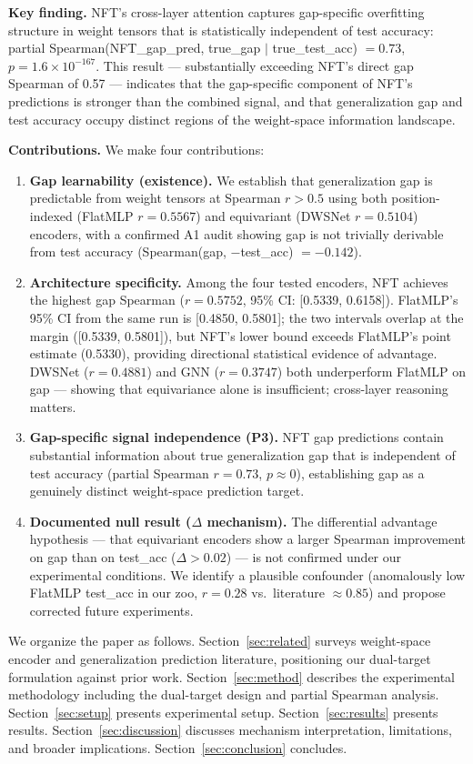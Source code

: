 \textbf{Key finding.} NFT's cross-layer attention captures gap-specific overfitting structure in weight tensors
that is statistically independent of test accuracy: partial Spearman(NFT\_gap\_pred, true\_gap $|$ true\_test\_acc)
$= 0.73$, $p = 1.6 \times 10^{-167}$. This result --- substantially exceeding NFT's direct gap Spearman of 0.57 ---
indicates that the gap-specific component of NFT's predictions is stronger than the combined signal, and
that generalization gap and test accuracy occupy distinct regions of the weight-space information landscape.

\textbf{Contributions.} We make four contributions:

\begin{enumerate}
\item \textbf{Gap learnability (existence).} We establish that generalization gap is predictable from weight tensors
   at Spearman $r > 0.5$ using both position-indexed (FlatMLP $r = 0.5567$) and equivariant (DWSNet $r = 0.5104$)
   encoders, with a confirmed A1 audit showing gap is not trivially derivable from test accuracy
   (Spearman(gap, $-$test\_acc) $= -0.142$).

\item \textbf{Architecture specificity.} Among the four tested encoders, NFT achieves the highest gap Spearman
   ($r = 0.5752$, 95\% CI: [0.5339, 0.6158]). FlatMLP's 95\% CI from the same run is [0.4850, 0.5801];
   the two intervals overlap at the margin ([0.5339, 0.5801]), but NFT's lower bound exceeds FlatMLP's
   point estimate (0.5330), providing directional statistical evidence of advantage. DWSNet ($r = 0.4881$)
   and GNN ($r = 0.3747$) both underperform FlatMLP on gap --- showing that equivariance alone is
   insufficient; cross-layer reasoning matters.

\item \textbf{Gap-specific signal independence (P3).} NFT gap predictions contain substantial information about
   true generalization gap that is independent of test accuracy (partial Spearman $r = 0.73$, $p \approx 0$),
   establishing gap as a genuinely distinct weight-space prediction target.

\item \textbf{Documented null result ($\Delta$ mechanism).} The differential advantage hypothesis --- that equivariant
   encoders show a larger Spearman improvement on gap than on test\_acc ($\Delta > 0.02$) --- is not confirmed
   under our experimental conditions. We identify a plausible confounder (anomalously low FlatMLP test\_acc
   in our zoo, $r = 0.28$ vs.\ literature $\approx 0.85$) and propose corrected future experiments.
\end{enumerate}

We organize the paper as follows. Section~\ref{sec:related} surveys weight-space encoder and generalization prediction
literature, positioning our dual-target formulation against prior work. Section~\ref{sec:method} describes the experimental
methodology including the dual-target design and partial Spearman analysis. Section~\ref{sec:setup} presents experimental
setup. Section~\ref{sec:results} presents results. Section~\ref{sec:discussion} discusses mechanism interpretation, limitations, and broader
implications. Section~\ref{sec:conclusion} concludes.
